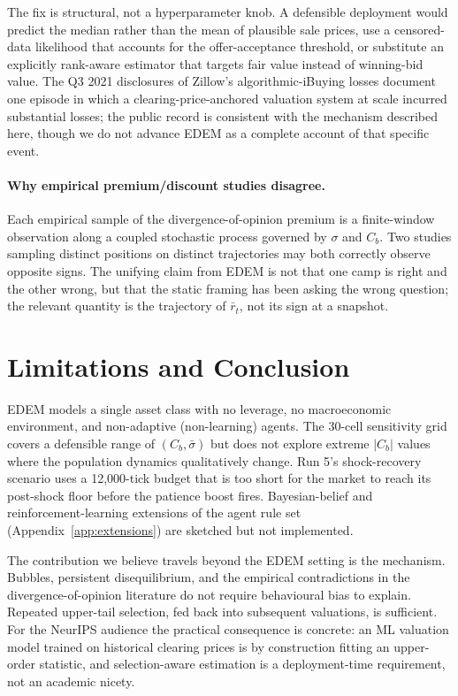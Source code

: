 \documentclass{article}
\begin{document}
The fix is structural, not a hyperparameter knob. A defensible
deployment would predict the median rather than the mean of
plausible sale prices, use a censored-data likelihood that accounts
for the offer-acceptance threshold, or substitute an explicitly
rank-aware estimator that targets fair value instead of
winning-bid value. The Q3 2021 disclosures of Zillow's
algorithmic-iBuying losses \citep{zillow2021ibuying} document one
episode in which a clearing-price-anchored valuation system at
scale incurred substantial losses; the public record is consistent
with the mechanism described here, though we do not advance EDEM
as a complete account of that specific event.

\paragraph{Why empirical premium/discount studies disagree.}
Each empirical sample of the divergence-of-opinion premium is a
finite-window observation along a coupled stochastic process
governed by $\sigma$ and $C_b$. Two studies sampling distinct
positions on distinct trajectories may both correctly observe
opposite signs. The unifying claim from EDEM is not that one camp
is right and the other wrong, but that the static framing has been
asking the wrong question; the relevant quantity is the trajectory
of $\bar r_t$, not its sign at a snapshot.

\section{Limitations and Conclusion}
\label{sec:conclusion}

EDEM models a single asset class with no leverage, no macroeconomic
environment, and non-adaptive (non-learning) agents. The
30-cell sensitivity grid covers a defensible range of $(C_b, \bar\sigma)$
but does not explore extreme $|C_b|$ values where the population
dynamics qualitatively change. Run 5's shock-recovery scenario uses
a 12{,}000-tick budget that is too short for the market to reach
its post-shock floor before the patience boost fires. Bayesian-belief
and reinforcement-learning extensions of the agent rule set
(Appendix~\ref{app:extensions}) are sketched but not implemented.

The contribution we believe travels beyond the EDEM setting is the
mechanism. Bubbles, persistent disequilibrium, and the empirical
contradictions in the divergence-of-opinion literature do not
require behavioural bias to explain. Repeated upper-tail selection,
fed back into subsequent valuations, is sufficient. For the
NeurIPS audience the practical consequence is concrete: an ML
valuation model trained on historical clearing prices is by
construction fitting an upper-order statistic, and selection-aware
estimation is a deployment-time requirement, not an academic
nicety.
\end{document}
